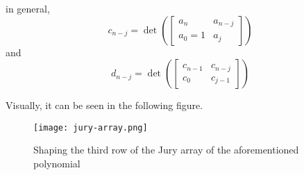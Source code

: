 \begin{enumerate}
    in general,
           \[
    c_{n-j} = \det\left( \begin{bmatrix}
        a_n & a_{n-j} \\
        a_0 =1   & a_j
    \end{bmatrix} \right)
    \]
    and
         \[
    d_{n-j} = \det\left( \begin{bmatrix}
        c_{n-1} & c_{n-j} \\
        c_0   & c_{j-1}
    \end{bmatrix} \right)
    \]
    
    Visually, it can be seen in the following figure.
    \begin{figure}[H]
    \centering
    \texttt{[image: jury-array.png]}
    \caption{Shaping the third row of the Jury array of the aforementioned polynomial}
\end{figure}


\end{enumerate}
